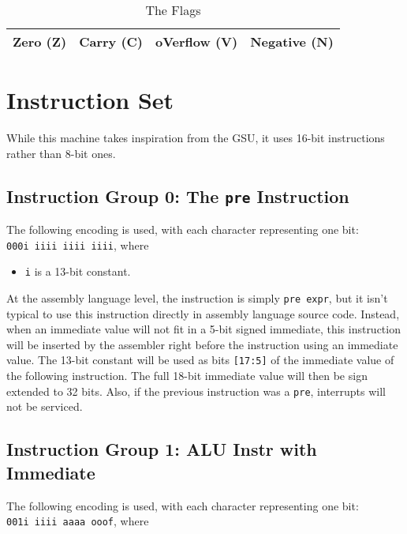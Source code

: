 \documentclass{article}
\begin{document}
	\begin{table}[H]
		\begin{center}
			\caption{The Flags}
			\label{tab:flags}
			\begin{tabular}{|c|c|c|c|}
				\hline
				Zero (Z) & Carry (C) & oVerflow (V) & Negative (N)\\
				\hline
			\end{tabular}
		\end{center}
	\end{table}

	\newpage
	\section{Instruction Set}
	While this machine takes inspiration from the GSU, it uses 16-bit
	instructions rather than 8-bit ones.

	\subsection{Instruction Group 0:  The \texttt{pre} Instruction}
	The following encoding is used, with each character representing one
	bit:  \\
	\texttt{000i iiii iiii iiii}, where 
	
	\singlespacing
	\begin{itemize}
		\item \texttt{i} is a 13-bit constant.
	\end{itemize}

	At the assembly language level, the instruction is simply
	\texttt{pre expr}, but it isn't typical to use this instruction
	directly in assembly language source code.  Instead, when an immediate
	value will not fit in a 5-bit signed immediate, this instruction will
	be inserted by the assembler right before the instruction using an
	immediate value.  The 13-bit constant will be used as bits
	\texttt{[17:5]} of the immediate value of the following instruction.
	The full 18-bit immediate value will then be sign extended to 32 bits.
	Also, if the previous instruction was a \texttt{pre}, interrupts will
	not be serviced.

	\subsection{Instruction Group 1:  ALU Instr with Immediate}
	The following encoding is used, with each character representing one
	bit:  \\
	\texttt{001i iiii aaaa ooof}, where
\end{document}
